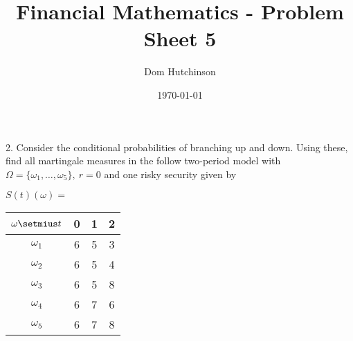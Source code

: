 \documentclass[11pt,a4paper]{article}
\begin{document}
\questionsfalse

\title{Financial Mathematics - Problem Sheet 5}
\author{Dom Hutchinson}
\date{\today}
\maketitle


\begin{question}{2.}
  Consider the conditional probabilities of branching up and down. Using these, find all martingale measures in the follow two-period model with $\Omega=\{\omega_1,\dots,\omega_5\},\ r=0$ and one risky security given by
  \begin{center}
    $S(t)(\omega)=$
    \begin{tabular}{c|ccc}
      $\omega\setmius t$&0&1&2\\\hline
      $\omega_1$&6&5&3\\
      $\omega_2$&6&5&4\\
      $\omega_3$&6&5&8\\
      $\omega_4$&6&7&6\\
      $\omega_5$&6&7&8
    \end{tabular}
  \end{center}
\end{question}
\end{document}
